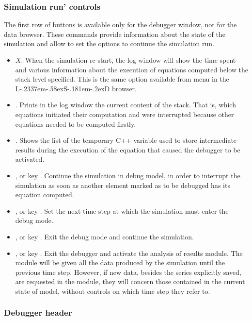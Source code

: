 \documentclass [11pt,a4paper] {book}
\def\LsD{{L\kern-.2337em\lower-.58ex\hbox{S}\kern-.181em\lower-.2ex\hbox{D}}\xspace}
\begin{document}
\subsubsection{Simulation run' controls}

The first row of buttons is available only for the debugger window, not for the data browser. These commands provide information about the state of the simulation and allow to set the options to continue the simulation run.

\begin{itemize}
	\item {} $X$. When the simulation re-start, the log window will show the time spent and various information about the execution of equations computed below the stack level specified. This is the same option available from menu  in the \LsD browser.
	\item {}. Prints in the log window the current content of the stack. That is, which equations initiated their computation and were interrupted because other equations needed to be computed firstly.
	\item {}. Shows the list of the temporary C++ variable used to store intermediate results during the execution of the equation that caused the debugger to be activated.
	\item {}, or key . Continue the simulation in debug model, in order to interrupt the simulation as soon as another element marked as to be debugged has its equation computed.
	\item {}, or key . Set the next time step at which the simulation must enter the debug mode.
	\item {}, or key . Exit the debug mode and continue the simulation.
	\item {}, or key . Exit the debugger and activate the analysis of results module. The module will be given all the data produced by the simulation until the previous time step. However, if new data, besides the series explicitly saved, are requested in the module, they will concern those contained in the current state of model, without controls on which time step they refer to.
\end{itemize}

\subsubsection{Debugger header}
\end{document}
